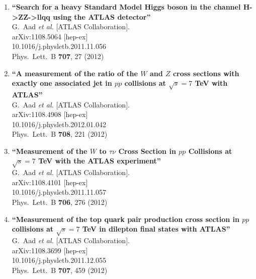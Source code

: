 \documentclass{article}
\begin{document}
\begin{enumerate}
\item%
{\bf ``Search for a heavy Standard Model Higgs boson in the channel H->ZZ->llqq using the ATLAS detector''}
  \\{}G.~Aad {\it et al.}  [ATLAS Collaboration].
  \\{}arXiv:1108.5064 [hep-ex]
    \\{}10.1016/j.physletb.2011.11.056
\\{}Phys.\ Lett.\ B {\bf 707}, 27 (2012) %


\item%
{\bf ``A measurement of the ratio of the $W$ and $Z$ cross sections with exactly one associated jet in $pp$ collisions at $\sqrt{s}=7$ TeV with ATLAS''}
  \\{}G.~Aad {\it et al.}  [ATLAS Collaboration].
  \\{}arXiv:1108.4908 [hep-ex]
    \\{}10.1016/j.physletb.2012.01.042
\\{}Phys.\ Lett.\ B {\bf 708}, 221 (2012) %


\item%
{\bf ``Measurement of the $W$ to $\tau \nu$ Cross Section in $pp$ Collisions at $\sqrt{s}=7$ TeV with the ATLAS experiment''}
  \\{}G.~Aad {\it et al.}  [ATLAS Collaboration].
  \\{}arXiv:1108.4101 [hep-ex]
    \\{}10.1016/j.physletb.2011.11.057
\\{}Phys.\ Lett.\ B {\bf 706}, 276 (2012) %


\item%
{\bf ``Measurement of the top quark pair production cross section in $pp$ collisions at $\sqrt{s}=7$ TeV in dilepton final states with ATLAS''}
  \\{}G.~Aad {\it et al.}  [ATLAS Collaboration].
  \\{}arXiv:1108.3699 [hep-ex]
    \\{}10.1016/j.physletb.2011.12.055
\\{}Phys.\ Lett.\ B {\bf 707}, 459 (2012) %



\end{enumerate}
\end{document}

